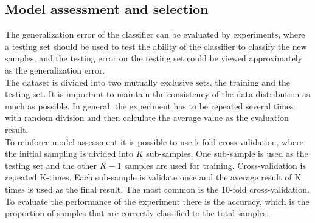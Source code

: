 \subsection{Model assessment and selection}
The generalization error of the classifier can be evaluated by experiments, where a testing set should be used to test the ability of the classifier to classify the new samples, and the testing error on the testing set could be viewed approximately as the generalization error.
\\
The dataset is divided into two mutually exclusive sets, the training and the testing set. It is important to maintain the consistency of the data distribution as much as possible. In general, the experiment has to be repeated several times with random division and then calculate the average value as the evaluation result.
\\ \indent
To reinforce model assessment it is possible to use k-fold cross-validation, where the initial sampling is divided into $K$ sub-samples. One sub-sample is used as the testing set and the other $K-1$ samples are used for training. Cross-validation is repeated K-times. Each sub-sample is validate once and the average result of K times is used as the final result. The most common is the 10-fold cross-validation.
\\ \indent
To evaluate the performance of the experiment there is the accuracy, which is the proportion of samples that are correctly classified to the total samples.

